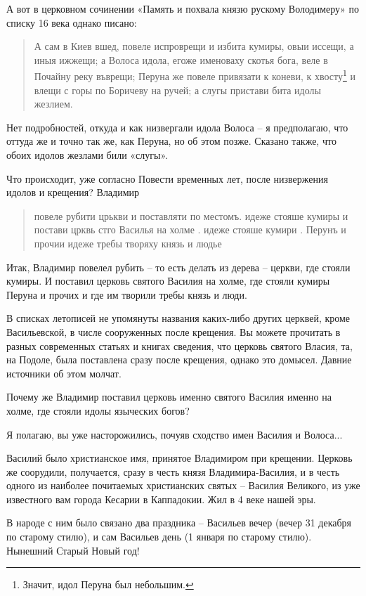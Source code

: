    А вот в церковном сочинении «Память и похвала князю рускому Володимеру» по списку 16 века однако писано:

\begin{quotation}
А сам в Киев вшед, повеле испроврещи и избита кумиры, овыи иссещи, а иныя ижжещи; а Волоса идола, егоже именоваху скотья бога, веле в Почайну реку въврещи; Перуна же повеле привязати к коневи, к хвосту\footnote{Значит, идол Перуна был небольшим.} и влещи с горы по Боричеву на ручей; а слугы пристави бита идолы жезлием.
\end{quotation}

   Нет подробностей, откуда и как низвергали идола Волоса – я предполагаю, что оттуда же и точно так же, как Перуна, но об этом позже. Сказано также, что обоих идолов жезлами били «слугы».

   Что происходит, уже согласно Повести временных лет, после низвержения идолов и крещения? Владимир 

\begin{quotation}
повеле рубити црькви и поставляти по местомъ. идеже стояше кумиры и постави црквь стго Василья на холме . идеже стояше кумири . Перунъ и прочии идеже требы творяху князь и людье
\end{quotation}

Итак, Владимир повелел рубить – то есть делать из дерева – церкви, где стояли кумиры. И поставил церковь святого Василия на холме, где стояли кумиры Перуна и прочих и где им творили требы князь и люди.

   В списках летописей не упомянуты названия каких-либо других церквей, кроме Васильевской, в числе сооруженных после крещения. Вы можете прочитать в разных современных статьях и книгах сведения, что церковь святого Власия, та, на Подоле, была поставлена сразу после крещения, однако это домысел. Давние источники об этом молчат.

   Почему же Владимир поставил церковь именно святого Василия именно на холме, где стояли идолы языческих богов?

   Я полагаю, вы уже насторожились, почуяв сходство имен Василия и Волоса...

   Василий было христианское имя, принятое Владимиром при крещении. Церковь же соорудили, получается, сразу в честь князя Владимира-Василия, и в честь одного из наиболее почитаемых христианских святых – Василия Великого, из уже известного вам города Кесарии в Каппадокии. Жил в 4 веке нашей эры.

   В народе с ним было связано два праздника – Васильев вечер (вечер 31 декабря по старому стилю), и сам Васильев день (1 января по старому стилю). Нынешний Старый Новый год!

